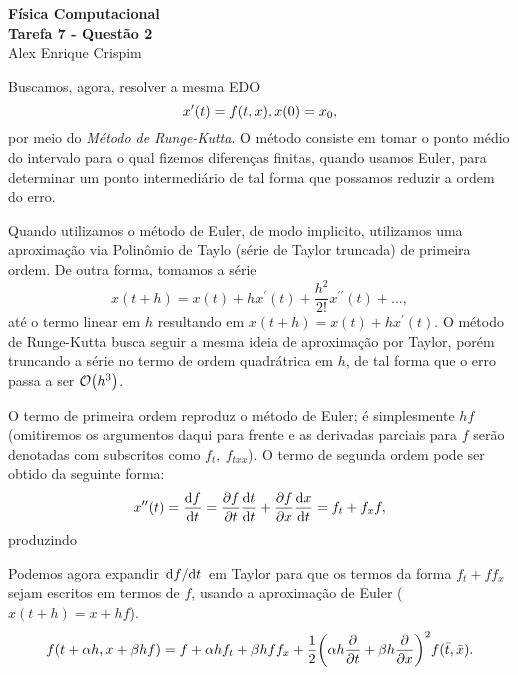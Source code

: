 


  \begin{center}
    \LARGE \textbf{Física Computacional} \\
    \Large \textbf{Tarefa 7 - Questão 2} \\
    \large Alex Enrique Crispim
  \end{center}

  Buscamos, agora, resolver a mesma EDO
  \begin{equation*}
    x^\prime (t) = f(t, x) , \\
    x(0) = x_0,
  \end{equation*}
  por meio do \textit{Método de Runge-Kutta}. O método consiste em tomar o ponto médio do intervalo para o qual fizemos diferenças finitas, quando usamos Euler, para determinar um ponto intermediário de tal forma que possamos reduzir a ordem do erro.

  Quando utilizamos o método de Euler, de modo implicito, utilizamos uma aproximação via Polinômio de Taylo (série de Taylor truncada) de primeira ordem. De outra forma, tomamos a série
  \begin{equation*}
    x(t + h) = x(t) + h x^\prime (t) + \frac{h^2}{2!} x^{\prime \prime}(t) + ...,
  \end{equation*}
  até o termo linear em $h$ resultando em $x(t+h) = x(t) + h x^\prime (t)$. O método de Runge-Kutta busca seguir a mesma ideia de aproximação por Taylor, porém truncando a série no termo de ordem quadrátrica em $h$, de tal forma que o erro passa a ser $\order{h^3}$.

  O termo de primeira ordem reproduz o método de Euler; é simplesmente $h f$ (omitiremos os argumentos daqui para frente e as derivadas parciais para $f$ serão denotadas com subscritos como $f_t, \ f_{txx}$). O termo de segunda ordem pode ser obtido da seguinte forma:
  \begin{equation*}
    x^{\prime \prime} (t) = \dv{f}{t} = \pdv{f}{t} \dv{t}{t} + \pdv{f}{x} \dv{x}{t} = f_t + f_x f,
  \end{equation*}
  produzindo

  Podemos agora expandir $\dv*{f}{t}$ em Taylor para que os termos da forma $f_t + f f_x$ sejam escritos em termos de $f$, usando a aproximação de Euler ($x(t+h) = x + hf$).
  \begin{equation*}
    f(t + \alpha h, x + \beta h f) = f + \alpha h f_t + \beta h f f_x + \frac{1}{2} \qty(\alpha h \pdv{t} + \beta h \pdv{x})^2 f(\bar{t}, \bar{x}).
  \end{equation*}

